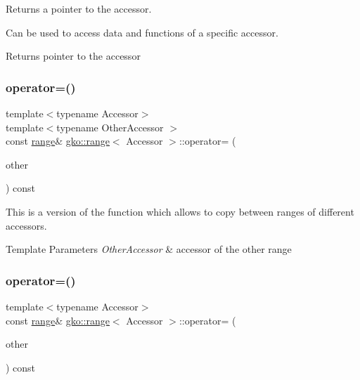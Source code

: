 Returns a pointer to the accessor. 

Can be used to access data and functions of a specific accessor.

\begin{DoxyReturn}{Returns}
pointer to the accessor 
\end{DoxyReturn}
\mbox{\label{classgko_1_1range_ab58e7e142727278bfd837dbc6f7d5b51}} 
\subsubsection{\texorpdfstring{operator=()}{operator=()}\hspace{0.1cm}{\footnotesize\ttfamily [1/2]}}
{\footnotesize\ttfamily template$<$typename Accessor$>$ \\
template$<$typename Other\+Accessor $>$ \\
const \hyperlink{classgko_1_1range}{range}\& \hyperlink{classgko_1_1range}{gko\+::range}$<$ Accessor $>$\+::operator= (\begin{DoxyParamCaption}\item[{const \hyperlink{classgko_1_1range}{range}$<$ Other\+Accessor $>$ \&}]{other }\end{DoxyParamCaption}) const}





This is a version of the function which allows to copy between ranges of different accessors.


\begin{DoxyTemplParams}{Template Parameters}
{\em Other\+Accessor} & accessor of the other range \\
\hline
\end{DoxyTemplParams}
\mbox{\label{classgko_1_1range_af3761a7996e353988dea26581f4390aa}} 
\subsubsection{\texorpdfstring{operator=()}{operator=()}\hspace{0.1cm}{\footnotesize\ttfamily [2/2]}}
{\footnotesize\ttfamily template$<$typename Accessor$>$ \\
const \hyperlink{classgko_1_1range}{range}\& \hyperlink{classgko_1_1range}{gko\+::range}$<$ Accessor $>$\+::operator= (\begin{DoxyParamCaption}\item[{const \hyperlink{classgko_1_1range}{range}$<$ Accessor $>$ \&}]{other }\end{DoxyParamCaption}) const}



